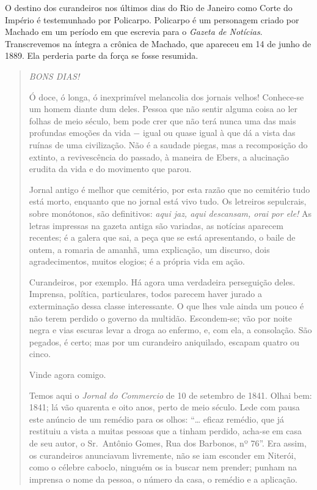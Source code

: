 O destino dos curandeiros nos últimos dias do Rio de Janeiro como Corte
do Império é testemunhado por Policarpo. Policarpo é um personagem
criado por Machado em um período em que escrevia para o \textit{Gazeta de
Notícias}. Transcrevemos na íntegra a crônica de Machado, que apareceu
em 14 de junho de 1889. Ela perderia parte da força se fosse resumida.

\begin{quote}
\textit{BONS DIAS!}

Ó doce, ó longa, ó inexprimível melancolia dos jornais velhos!
Conhece-se um homem diante dum deles. Pessoa que não sentir alguma coisa
ao ler folhas de meio século, bem pode crer que não terá nunca uma das
mais profundas emoções da vida − igual ou quase igual à que dá a vista
das ruínas de uma civilização. Não é a saudade piegas, mas a
recomposição do extinto, a revivescência do passado, à maneira de Ebers,
a alucinação erudita da vida e do movimento que parou.

Jornal antigo é melhor que cemitério, por esta razão que no cemitério
tudo está morto, enquanto que no jornal está vivo tudo. Os letreiros
sepulcrais, sobre monótonos, são definitivos: \textit{aqui jaz, aqui
descansam, orai por ele!} As letras impressas na gazeta antiga são
variadas, as notícias aparecem recentes; é a galera que sai, a peça que
se está apresentando, o baile de ontem, a romaria de amanhã, uma
explicação, um discurso, dois agradecimentos, muitos elogios; é a
própria vida em ação.

Curandeiros, por exemplo. Há agora uma verdadeira perseguição deles.
Imprensa, política, particulares, todos parecem haver jurado a
exterminação dessa classe interessante. O que lhes vale ainda um pouco é
não terem perdido o governo da multidão. Escondem-se; vão por noite
negra e vias escuras levar a droga ao enfermo, e, com ela, a consolação.
São pegados, é certo; mas por um curandeiro aniquilado, escapam quatro
ou cinco.

Vinde agora comigo.

Temos aqui o \textit{Jornal do Commercio} de 10 de setembro de 1841. Olhai
bem: 1841; lá vão quarenta e oito anos, perto de meio século. Lede com
pausa este anúncio de um remédio para os olhos: ``\dots{} eficaz remédio,
que já restituiu a vista a muitas pessoas que a tinham perdido, acha-se
em casa de seu autor, o Sr.~Antônio Gomes, Rua dos Barbonos, nº 76''.
Era assim, os curandeiros anunciavam livremente, não se iam esconder em
Niterói, como o célebre caboclo, ninguém os ia buscar nem prender;
punham na imprensa o nome da pessoa, o número da casa, o remédio e a
aplicação.


\end{quote}
